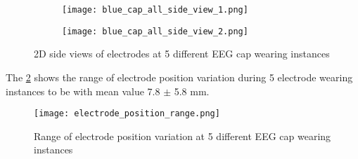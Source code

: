 \begin{figure}[hbt!]
	\centering
	\begin{subfigure}{0.49\textwidth}
		\texttt{[image: blue\_cap\_all\_side\_view\_1.png]}	
	\end{subfigure}
	\hfill
	\begin{subfigure}{0.49\textwidth}
		\texttt{[image: blue\_cap\_all\_side\_view\_2.png]}	
	\end{subfigure}
	\caption{2D side views of electrodes at 5 different EEG cap wearing instances} 
	\label{fig:blue_cap_all_side_view}
\end{figure} 

\hfill
\newpage
The \cref{fig:electrode_position_range} shows the range of electrode position variation during 5 electrode wearing instances to be with mean value 7.8 $\pm$ 5.8 mm.
\begin{figure}[ht!]
	\centering
	\texttt{[image: electrode\_position\_range.png]}
	\caption{Range of electrode position variation at 5 different EEG cap wearing instances} 
	\label{fig:electrode_position_range}
\end{figure}